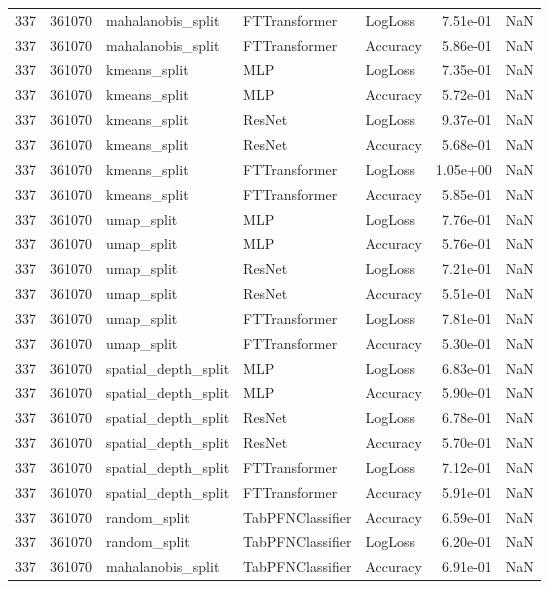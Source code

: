 \begin{tabular}{rrlllrr}
337 & 361070 & mahalanobis\_split & FTTransformer & LogLoss & 7.51e-01 & NaN \\
337 & 361070 & mahalanobis\_split & FTTransformer & Accuracy & 5.86e-01 & NaN \\
337 & 361070 & kmeans\_split & MLP & LogLoss & 7.35e-01 & NaN \\
337 & 361070 & kmeans\_split & MLP & Accuracy & 5.72e-01 & NaN \\
337 & 361070 & kmeans\_split & ResNet & LogLoss & 9.37e-01 & NaN \\
337 & 361070 & kmeans\_split & ResNet & Accuracy & 5.68e-01 & NaN \\
337 & 361070 & kmeans\_split & FTTransformer & LogLoss & 1.05e+00 & NaN \\
337 & 361070 & kmeans\_split & FTTransformer & Accuracy & 5.85e-01 & NaN \\
337 & 361070 & umap\_split & MLP & LogLoss & 7.76e-01 & NaN \\
337 & 361070 & umap\_split & MLP & Accuracy & 5.76e-01 & NaN \\
337 & 361070 & umap\_split & ResNet & LogLoss & 7.21e-01 & NaN \\
337 & 361070 & umap\_split & ResNet & Accuracy & 5.51e-01 & NaN \\
337 & 361070 & umap\_split & FTTransformer & LogLoss & 7.81e-01 & NaN \\
337 & 361070 & umap\_split & FTTransformer & Accuracy & 5.30e-01 & NaN \\
337 & 361070 & spatial\_depth\_split & MLP & LogLoss & 6.83e-01 & NaN \\
337 & 361070 & spatial\_depth\_split & MLP & Accuracy & 5.90e-01 & NaN \\
337 & 361070 & spatial\_depth\_split & ResNet & LogLoss & 6.78e-01 & NaN \\
337 & 361070 & spatial\_depth\_split & ResNet & Accuracy & 5.70e-01 & NaN \\
337 & 361070 & spatial\_depth\_split & FTTransformer & LogLoss & 7.12e-01 & NaN \\
337 & 361070 & spatial\_depth\_split & FTTransformer & Accuracy & 5.91e-01 & NaN \\
337 & 361070 & random\_split & TabPFNClassifier & Accuracy & 6.59e-01 & NaN \\
337 & 361070 & random\_split & TabPFNClassifier & LogLoss & 6.20e-01 & NaN \\
337 & 361070 & mahalanobis\_split & TabPFNClassifier & Accuracy & 6.91e-01 & NaN \\

\end{tabular}
